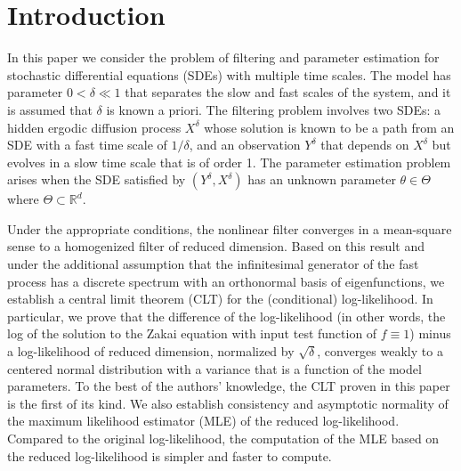 \documentclass{article}
\begin{document}
\section{Introduction} \label{S:Introduction}
In this paper we consider the problem of filtering and parameter estimation for stochastic differential equations (SDEs) with multiple time scales. The model has parameter $0<\delta\ll 1$ that separates the slow and fast scales of the system, and it is assumed that $\delta$ is known a priori. The filtering problem involves two
 SDEs: a hidden ergodic diffusion process $X^{\delta}$ whose solution is known to be a path from an  SDE with a fast time scale of $1/\delta$, and an observation $Y^{\delta}$ that depends on $X^{\delta}$ but evolves in a slow time scale that is of order 1. The parameter estimation problem arises when the SDE satisfied by $(Y^{\delta},X^{\delta})$  has an unknown parameter $\theta\in\Theta$ where $\Theta\subset\mathbb{R}^{d}$.

Under the appropriate conditions, the nonlinear filter converges in a mean-square sense to a homogenized filter of reduced
 dimension. Based on this result and under the additional assumption that the infinitesimal generator of the fast process has a discrete spectrum with an orthonormal basis of eigenfunctions, we establish a central limit theorem (CLT) for the (conditional) log-likelihood. In particular, we prove that the difference of the log-likelihood (in other words, the log of the solution to the Zakai equation with input test function of $f\equiv 1$) minus a  log-likelihood of reduced dimension, normalized by $\sqrt{\delta}$, converges weakly to a centered normal distribution with a variance that is a function of the model parameters. To the best of the authors' knowledge, the CLT proven in this paper is the first of its kind. We also establish consistency and asymptotic normality of the maximum likelihood estimator (MLE) of the reduced log-likelihood. Compared to the original log-likelihood, the computation of the MLE based on the reduced log-likelihood is simpler and faster to compute.
\end{document}
